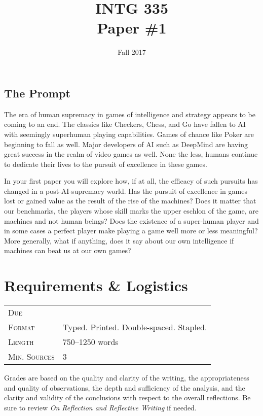 \documentclass[nobib]{tufte-handout}
\title{INTG 335 \\ Paper \#1 }
\date{ Fall 2017 }
\begin{document}
\maketitle
\thispagestyle{empty}

\subsection*{The Prompt}

The era of human supremacy in games of intelligence and strategy appears to be coming to an end. The classics like Checkers, Chess, and Go have fallen to AI with seemingly superhuman playing capabilities. Games of chance like Poker are beginning to fall as well. Major developers of AI such as DeepMind are having great success in the realm of video games as well. None the less, humans continue to dedicate their lives to the pursuit of excellence in these games.

In your first paper you will explore how, if at all, the efficacy of such pursuits has changed in a post-AI-supremacy world. Has the pursuit of excellence in games lost or gained value as the result of the rise of the machines? Does it matter that our benchmarks, the players whose skill marks the upper eschlon of the game, are machines and not human beings?  Does the existence of a super-human player and in some cases a perfect player make playing a game well more or less meaningful? More generally, what if anything, does it say about our own intelligence if machines can beat us at our own games?

\section{Requirements \& Logistics}

\begin{tabular}{ll}
\textsc{Due} &  \\
\textsc{Format} & Typed. Printed. Double-spaced. Stapled. \\
\textsc{Length} & 750--1250 words \\
\textsc{Min. Sources} & 3
\end{tabular}
\vspace{.25in}

Grades are based on the quality and clarity of the writing, the appropriateness and quality of observations, the depth and sufficiency of the analysis, and the clarity and validity of the conclusions with respect to the overall reflections. Be sure to review \textit{On Reflection and Reflective Writing} if needed.
\end{document}
